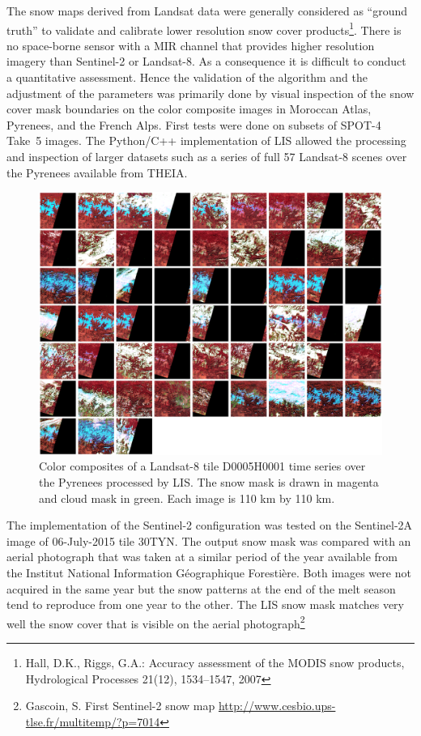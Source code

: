 \documentclass[a4paper]{article}
\begin{document}
The snow maps derived from Landsat data were generally considered as ``ground truth'' to validate and calibrate lower resolution snow cover products\footnote{Hall, D.K., Riggs, G.A.: Accuracy assessment of the MODIS snow products, Hydrological Processes 21(12), 1534–1547, 2007}. There is no space-borne sensor with a MIR channel that provides higher resolution imagery than Sentinel-2 or Landsat-8. As a consequence it is difficult to conduct a quantitative assessment. Hence the validation of the algorithm and the adjustment of the parameters was primarily done by visual inspection of the snow cover mask boundaries on the color composite images in Moroccan Atlas, Pyrenees, and the French Alps. First tests were done on subsets of SPOT-4 Take~5 images. The Python/C++ implementation of LIS allowed the processing and inspection of larger datasets such as a series of full 57 Landsat-8 scenes over the Pyrenees available from THEIA.

\begin{figure}[h]
 \centering
 \includegraphics[width=\textwidth]{./images/montage_L8CESneige.png}
 \caption{Color composites of a Landsat-8 tile D0005H0001 time series over the Pyrenees processed by LIS. The snow mask is drawn in magenta and cloud mask in green. Each image is 110 km by 110 km.}
 \label{fig:L8montage}
\end{figure}

The implementation of the Sentinel-2 configuration was tested on the Sentinel-2A image of 06-July-2015 tile 30TYN. The output snow mask was compared with an aerial photograph that was taken at a similar period of the year available from the Institut National Information Géographique Forestière. Both images were not acquired in the same year but the snow patterns at the end of the melt season tend to reproduce from one year to the other. The LIS snow mask matches very well the snow cover that is visible on the aerial photograph\footnote{Gascoin, S. First Sentinel-2 snow map \url{http://www.cesbio.ups-tlse.fr/multitemp/?p=7014}}
\end{document}
